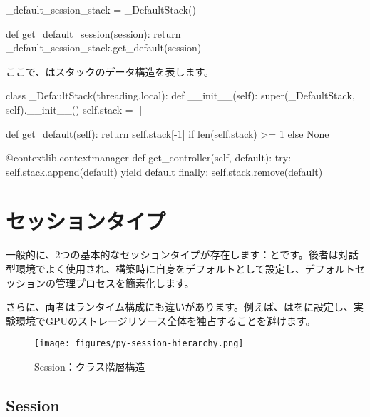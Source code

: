 \begin{content}
\begin{content}
\begin{leftbar}
\begin{python}
_default_session_stack = _DefaultStack()

def get_default_session(session):
  return _default_session_stack.get_default(session)
\end{python}
\end{leftbar}

ここで、はスタックのデータ構造を表します。

\begin{leftbar}
\begin{python}
class _DefaultStack(threading.local):
  def __init__(self):
    super(_DefaultStack, self).__init__()
    self.stack = []

  def get_default(self):
    return self.stack[-1] if len(self.stack) >= 1 else None

  @contextlib.contextmanager
  def get_controller(self, default):
    try:
      self.stack.append(default)
      yield default
    finally:
      self.stack.remove(default)
\end{python}
\end{leftbar}

\end{content}

\section{セッションタイプ}

\begin{content}

一般的に、2つの基本的なセッションタイプが存在します：とです。後者は対話型環境でよく使用され、構築時に自身をデフォルトとして設定し、デフォルトセッションの管理プロセスを簡素化します。

さらに、両者はランタイム構成にも違いがあります。例えば、はをに設定し、実験環境でGPUのストレージリソース全体を独占することを避けます。

\begin{figure}[!htbp]
\centering
\texttt{[image: figures/py-session-hierarchy.png]}
\caption{Session：クラス階層構造}
 \label{fig:py-session-hierarchy}
\end{figure}

\subsection{Session}


\end{content}
\end{content}
